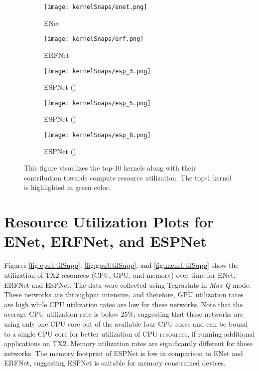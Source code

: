 \documentclass[runningheads]{llncs}
\begin{document}
\begin{figure}[t!]
	\centering
	\begin{subfigure}[b]{0.49\columnwidth}
		\centering
		\texttt{[image: kernelSnaps/enet.png]}
		\caption{ENet}
		\label{fig:enetKernSup}
	\end{subfigure}
	\hfill
	\begin{subfigure}[b]{0.49\columnwidth}
		\centering
		\texttt{[image: kernelSnaps/erf.png]}
		\caption{ERFNet}
		\label{fig:erfKernSup}
	\end{subfigure}
	\vfill
	\begin{subfigure}[b]{0.49\columnwidth}
		\centering
		\texttt{[image: kernelSnaps/esp\_3.png]}
		\caption{ESPNet ()}
		\label{fig:espOneSup}
	\end{subfigure}
	\hfill
	\begin{subfigure}[b]{0.49\columnwidth}
		\centering
		\texttt{[image: kernelSnaps/esp\_5.png]}
		\caption{ESPNet ()}
		\label{fig:espTwoSup}
	\end{subfigure}
	\vfill
	\begin{subfigure}[b]{\columnwidth}
		\centering
		\texttt{[image: kernelSnaps/esp\_8.png]}
		\caption{ESPNet ()}
		\label{fig:espThreeSup}
	\end{subfigure}
	\caption{This figure visualizes the top-10 kernels along with their contribution towards compute resource utilization. The top-1 kernel is highlighted in green color.}
	\label{fig:topKernelVisSup}
\end{figure}

\section{Resource Utilization Plots for ENet, ERFNet, and ESPNet}
\label{sec:resourceUtilTop}

Figures \ref{fig:cpuUtilSupp},  \ref{fig:gpuUtilSupp}, and  \ref{fig:memUtilSupp} show the utilization of TX2 resources (CPU, GPU, and memory) over time for ENet, ERFNet and ESPNet. The data were collected using Tegrastats in \textit{Max-Q} mode. These networks are throughput intensive, and therefore, GPU utilization rates are high while CPU utilization rates are low for these networks. Note that the average CPU utilization rate is below 25\%; suggesting that these networks are using only one CPU core out of the available four CPU cores and can be bound to a single CPU core for better utilization of CPU resources, if running additional applications on TX2. Memory utilization rates are significantly different for these networks. The memory footprint of ESPNet is low in comparison to ENet and ERFNet, suggesting ESPNet is suitable for memory constrained devices.
\end{document}
